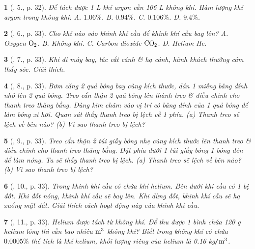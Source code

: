 \documentclass{article}
\newtheorem{baitoan}{}
\begin{document}
\begin{baitoan}[\cite{ncpt_KHTN_6_tap_1}, 5., p. 32]
	Để tách được {\rm1 L} khí argon cần {\rm106 L} không khí. Hàm lượng khí argon trong không khí: {\sf A.} $1.06\%$. {\sf B.} $0.94\%$. {\sf C.} $0.106\%$. {\sf D.} $9.4\%$.
\end{baitoan}

\begin{baitoan}[\cite{ncpt_KHTN_6_tap_1}, 6., p. 33]
	Cho khí nào vào khinh khí cầu để khinh khí cầu bay lên? {\sf A.} Oxygen $\rm O_2$. {\sf B.} Không khí. {\sf C.} Carbon dioxide $\rm CO_2$. {\sf D.} Helium {\rm He}.
\end{baitoan}

\begin{baitoan}[\cite{ncpt_KHTN_6_tap_1}, 7., p. 33]
	Khi đi máy bay, lúc cất cánh \& hạ cánh, hành khách thường cảm thấy sóc. Giải thích.
\end{baitoan}

\begin{baitoan}[\cite{ncpt_KHTN_6_tap_1}, 8., p. 33]
	Bơm căng 2 quả bóng bay cùng kích thước, dán 1 miếng băng dính nhỏ lên 2 quả bóng. Treo cẩn thận 2 quả bóng lên thành treo \& điều chỉnh cho thanh treo thăng bằng. Dùng kim châm vào vị trí có băng dính của 1 quả bóng để làm bóng xì hơi. Quan sát thấy thanh treo bị lệch về 1 phía. (a) Thanh treo sẽ lệch về bên nào? (b) Vì sao thanh treo bị lệch?
\end{baitoan}

\begin{baitoan}[\cite{ncpt_KHTN_6_tap_1}, 9., p. 33]
	Treo cẩn thận 2 túi giấy bóng nhẹ cùng kích thước lên thanh treo \& điều chỉnh cho thanh treo thăng bằng. Đặt phía dưới 1 túi giấy bóng 1 bóng đèn để làm nóng. Ta sẽ thấy thanh treo bị lệch. (a) Thanh treo sẽ lệch về bên nào? (b) Vì sao thanh treo bị lệch?
\end{baitoan}

\begin{baitoan}[\cite{ncpt_KHTN_6_tap_1}, 10., p. 33]
	Trong khinh khí cầu có chứa khí helium. Bên dưới khí cầu có 1 bệ đốt. Khi đốt nóng, khinh khí cầu sẽ bay lên. Khi dừng đốt, khinh khí cầu sẽ hạ xuống mặt đất. Giải thích cách hoạt động này của khinh khí cầu.
\end{baitoan}

\begin{baitoan}[\cite{ncpt_KHTN_6_tap_1}, 11., p. 33]
	Helium được tách từ không khí. Để thu được 1 bình chứa {\rm120 g} helium lỏng thì cần bao nhiêu $\rm m^3$ không khí? Biết trong không khí có chứa $0.0005\%$ thể tích là khí helium, khối lượng riêng của helium là {\rm0.16 kg{\tt/}$\rm m^3$}.
\end{baitoan}
\end{document}
